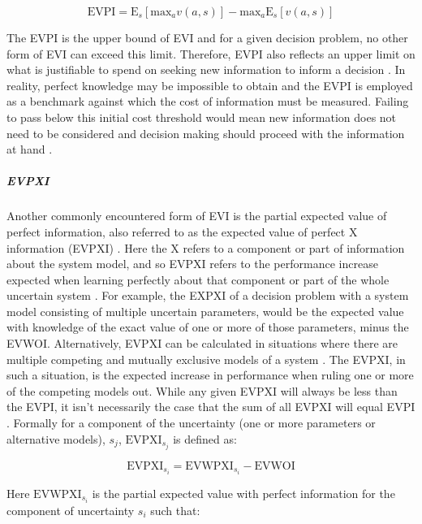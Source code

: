 \documentclass[]{article}
\theoremstyle{definition}
\theoremstyle{definition}
\theoremstyle{definition}
\theoremstyle{remark}
\begin{document}
\begin{equation}
\mathrm{EVPI} = \mathrm{E}_s[\mathrm{max}_av(a, s)] - \mathrm{max}_a\mathrm{E}_s[{v(a, s)}]
\label{eq:EVPI2}
\end{equation}

The EVPI is the upper bound of EVI and for a given decision problem, no
other form of EVI can exceed this limit. Therefore, EVPI also reflects
an upper limit on what is justifiable to spend on seeking new
information to inform a decision \citep{Yokota2004b}. In reality,
perfect knowledge may be impossible to obtain and the EVPI is employed
as a benchmark against which the cost of information must be measured.
Failing to pass below this initial cost threshold would mean new
information does not need to be considered and decision making should
proceed with the information at hand \citep{Runge2011a}.

\subparagraph*{EVPXI}\label{evpxi}

Another commonly encountered form of EVI is the partial expected value
of perfect information, also referred to as the expected value of
perfect X information (EVPXI) \citep[e.g.,][]{Moore2012, Johnson2014a}.
Here the X refers to a component or part of information about the system
model, and so EVPXI refers to the performance increase expected when
learning perfectly about that component or part of the whole uncertain
system \citep{Yokota2004b}. For example, the EXPXI of a decision problem
with a system model consisting of multiple uncertain parameters, would
be the expected value with knowledge of the exact value of one or more
of those parameters, minus the EVWOI. Alternatively, EVPXI can be
calculated in situations where there are multiple competing and mutually
exclusive models of a system \citep[e.g.,][]{Runge2011a}. The EVPXI, in
such a situation, is the expected increase in performance when ruling
one or more of the competing models out. While any given EVPXI will
always be less than the EVPI, it isn't necessarily the case that the sum
of all EVPXI will equal EVPI \citep{Samson1989}. Formally for a
component of the uncertainty (one or more parameters or alternative
models), \(s_j\), \(\mathrm{EVPXI}_{s_j}\) is defined as:

\begin{equation}
\mathrm{EVPXI}_{s_i} = \mathrm{EVWPXI}_{s_i} - \mathrm{EVWOI}
\label{eq:EVPXI}
\end{equation}

Here \(\mathrm{EVWPXI}_{s_i}\) is the partial expected value with
perfect information for the component of uncertainty \({s_i}\) such
that:
\end{document}
